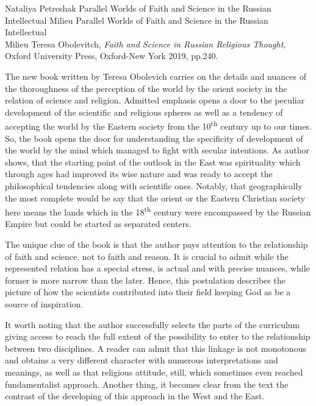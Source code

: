 \begin{recplenv}{Nataliya Petreshak}
	{Parallel Worlds of Faith and Science in the Russian Intellectual Milieu}
	{Parallel Worlds of Faith and Science in the Russian Intellectual\\Milieu}
	{Teresa Obolevitch, \textit{Faith and Science in Russian Religious Thought}, Oxford University Press, Oxford-New York 2019,
		pp.240.}
 





The new book written by Teresa Obolevich carries on the details and nuances of the thoroughness of the
perception of the world by the orient society in the relation of science and religion. Admitted emphasis opens a door
to the peculiar development of the scientific and religious spheres as well as a tendency of accepting the world by the
Eastern society from the 10\textsuperscript{th}  century up to our times. So, the book opens the door for understanding
the specificity of development of the world by the mind which managed to fight with secular intentions. As author
shows, that the starting point of the outlook in the East was spirituality which through ages had improved its wise
nature and was ready to accept the philosophical tendencies along with scientific ones. Notably, that geographically
the most complete would be say that the orient or the Eastern Christian society here means the lands which in the
18\textsuperscript{th} century were encompassed by the Russian Empire but could be started as separated centers.


The unique clue of the book is that the author pays attention to the relationship of faith and science, not to faith and
reason. It is crucial to admit while the represented relation has a special stress, is actual and with precise nuances,
while former is more narrow than the later. Hence, this postulation describes the picture of how the scientists
contributed into their field keeping God as be a source of inspiration.


It worth noting that the author successfully selects the parts of the curriculum giving access to reach the full extent
of the possibility to enter to the relationship between two disciplines. A reader can admit that this linkage is not
monotonous and obtains a very different character with numerous interpretations and meanings, as well as that religious
attitude, still, which sometimes even reached fundamentalist approach. Another thing, it becomes clear from the text
the contrast of the developing of this approach in the West and the East.



\end{recplenv}
